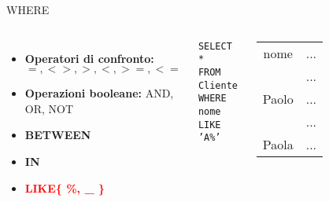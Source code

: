     \begin{frame}{WHERE}
    \begin{columns}[T,onlytextwidth]
    \begin{itemize}
        \item \textbf{Operatori di confronto:} $=, <>, >, <, >=, <=$
        \item \textbf{Operazioni booleane:} AND, OR, NOT
        \item \textbf{BETWEEN}
        \item \textbf{IN}
        \item \textbf{\textcolor{red}{LIKE\{ \%, \_ \}}}
    \end{itemize}
    \vspace{2em}
    \texttt{SELECT * \\FROM Cliente\\WHERE nome LIKE 'A\%'}
    \centering
    \begin{table}[h]
    \centering
    \begin{tabular}{|c|c|}
    \hline
    \rowcolor{cyan!30}\multicolumn{2}{|c|}{Cliente} \\
    \hline
    \rowcolor{cyan!30}nome &  ...  \\
    \hline
    \cellcolor{red!20}{Anna} &  ... \\
    Paolo &  ...  \\
    \cellcolor{red!20}{Asia} &  ...  \\
    Paola &  ...  \\
    \hline
    \end{tabular}
    \end{table}
    \end{columns}
    \end{frame}
